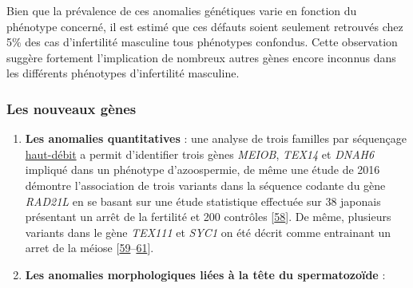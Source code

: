 \documentclass[12pt,twoside]{reedthesis}
\theoremstyle{definition}
\theoremstyle{definition}
\theoremstyle{remark}
\begin{document}
  Bien que la prévalence de ces anomalies génétiques varie en fonction du
  phénotype concerné, il est estimé que ces défauts soient seulement
  retrouvés chez 5\% des cas d'infertilité masculine tous phénotypes
  confondus. Cette observation suggère fortement l'implication de nombreux
  autres gènes encore inconnus dans les différents phénotypes
  d'infertilité masculine.
  
  \newpage
  
  \subsubsection{Les nouveaux gènes}\label{les-nouveaux-genes}
  
  \begin{enumerate}
  \def\labelenumi{\arabic{enumi}.}
  \item
    \textbf{Les anomalies quantitatives} : une analyse de trois familles
    par séquençage \protect\hyperlink{ngs}{haut-débit} a permit
    d'identifier trois gènes \emph{MEIOB}, \emph{TEX14} et \emph{DNAH6}
    impliqué dans un phénotype d'azoospermie, de même une étude de 2016
    démontre l'association de trois variants dans la séquence codante du
    gène \emph{RAD21L} en se basant sur une étude statistique effectuée
    sur 38 japonais présentant un arrêt de la fertilité et 200 contrôles
    {[}\protect\hyperlink{ref-Minase2017}{58}{]}. De même, plusieurs
    variants dans le gène \emph{TEX111} et \emph{SYC1} on été décrit comme
    entrainant un arret de la méiose
    {[}\protect\hyperlink{ref-Yatsenko2015}{59}--\protect\hyperlink{ref-Maor-Sagie2015}{61}{]}.
  \item
    \textbf{Les anomalies morphologiques liées à la tête du spermatozoïde}
    :
  

\end{enumerate}
\end{document}
